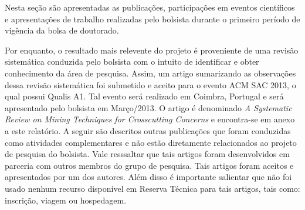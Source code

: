 Nesta seção são apresentadas as publicações, participações em eventos científicos e apresentações de trabalho realizadas pelo bolsista durante o primeiro período de vigência da bolsa de doutorado. 

Por enquanto, o resultado mais relevente do projeto é proveniente de uma revisão sistemática conduzida pelo bolsista com o intuito de identificar e obter conhecimento da área de pesquisa. Assim, um artigo sumarizando as observações dessa revisão sistemática foi submetido e aceito para o evento ACM SAC 2013, o qual possui Qualis A1. Tal evento será realizado em Coimbra, Portugal e será apresentado pelo bolsista em Março/2013. O artigo é denominado \textit{A Systematic Review on Mining Techniques for Crosscutting Concerns} e encontra-se em anexo a este relatório. A seguir são descritos outras publicações que foram conduzidas como atividades complementares e não estão diretamente relacionados ao projeto de pesquisa do bolsista. Vale resssaltar que tais artigos foram desenvolvidos em parceria com outros membros do grupo de pesquisa. Tais artigos foram aceitos e apresentados por um dos autores. Além disso é importante salientar que não foi usado nenhum recurso disponível em Reserva Técnica para tais artigos, tais como: inscrição, viagem ou hospedagem.



